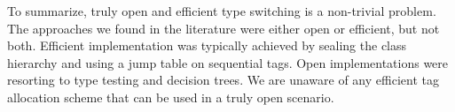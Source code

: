 To summarize, truly open and efficient type switching is a non-trivial problem. 
The approaches we found in the literature were either open or efficient, 
but not both. Efficient implementation was typically achieved by sealing the 
class hierarchy and using a jump table on sequential tags. Open implementations 
were resorting to type testing and decision trees. 
We are unaware of any efficient tag allocation scheme that can be used in a 
truly open scenario.
